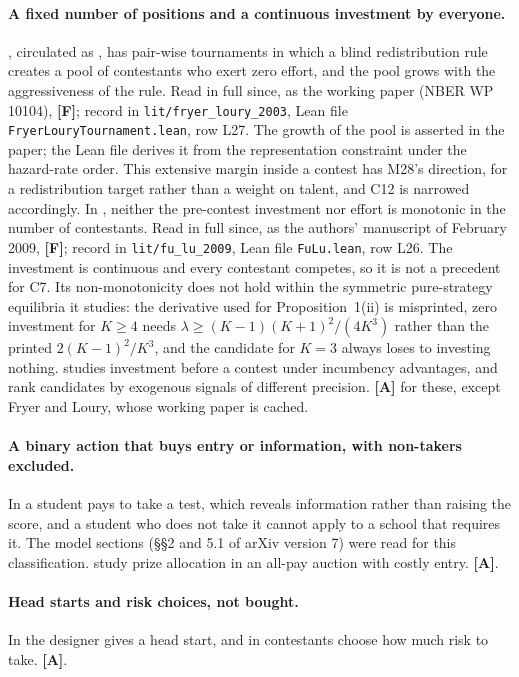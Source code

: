 \documentclass[11pt,a4paper]{article}
\begin{document}
\paragraph{A fixed number of positions and a continuous investment by everyone.}
\citet{FryerLoury2005}, circulated as \citet{FryerLoury2003}, has pair-wise
tournaments in which a blind redistribution rule creates a pool of contestants
who exert zero effort, and the pool grows with the aggressiveness of the rule.
Read in full since, as the working paper (NBER WP 10104), \textbf{[F]}; record in
\texttt{lit/fryer\_loury\_2003}, Lean file \texttt{FryerLouryTournament.lean},
row L27. The growth of the pool is asserted in the paper; the Lean file derives
it from the representation constraint under the hazard-rate order. This
extensive margin inside a contest has M28's direction, for a redistribution
target rather than a weight on talent, and C12 is narrowed accordingly. In
\citet{FuLu2009}, neither the pre-contest investment nor effort is monotonic in
the number of contestants. Read in full since, as the authors' manuscript of
February 2009, \textbf{[F]}; record in \texttt{lit/fu\_lu\_2009}, Lean file
\texttt{FuLu.lean}, row L26. The investment is continuous and every contestant
competes, so it is not a precedent for C7. Its non-monotonicity does not hold
within the symmetric pure-strategy equilibria it studies: the derivative used
for Proposition~1(ii) is misprinted, zero investment for $K\ge4$ needs
$\lambda\ge(K-1)(K+1)^2/(4K^3)$ rather than the printed $2(K-1)^2/K^3$, and the
candidate for $K=3$ always loses to investing nothing. \citet{Konrad2002}
studies investment before a contest under incumbency advantages, and
\citet{CornellWelch1996} rank candidates by exogenous signals of different
precision. \textbf{[A]} for these, except Fryer and Loury, whose working paper
is cached.

\paragraph{A binary action that buys entry or information, with non-takers
excluded.}
In \citet{GargLiMonachou2026} a student pays to take a test, which reveals
information rather than raising the score, and a student who does not take it
cannot apply to a school that requires it. The model sections (\S\S2 and 5.1 of
arXiv version 7) were read for this classification. \citet{LiuLu2019} study
prize allocation in an all-pay auction with costly entry. \textbf{[A]}.

\paragraph{Head starts and risk choices, not bought.}
In \citet{KawamuraMorenoDeBarreda2014} the designer gives a head start, and in
\citet{HvideKristiansen2003} contestants choose how much risk to take.
\textbf{[A]}.
\end{document}
